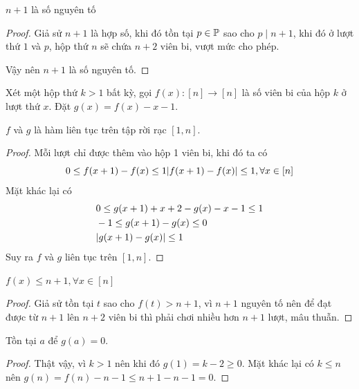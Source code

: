 \documentclass[11pt]{scrartcl}
\begin{document}
\begin{itemize}[label=, leftmargin=0em, itemsep=0.5em]
\begin{sol}
         $n + 1$ là số nguyên tố 
        \begin{proof}
            Giả sử $n + 1$ là hợp số, khi đó tồn tại $p \in \mathbb{P}$ sao cho $p \mid n + 1$, khi đó ở lượt thứ $1$ và $p$, hộp thứ $n$ sẽ chứa $n + 2$ viên bi, vượt mức cho phép.

            Vậy nên $n + 1$ là số nguyên tố.
        \end{proof}
        Xét một hộp thứ $k >1$ bất kỳ, gọi $f(x): [n] \to [n]$ là số viên bi của hộp $k$ ở lượt thứ $x$. Đặt $g(x) = f(x) - x - 1$. 
        
        
         $f$ và $g$ là hàm liên tục trên tập rời rạc $[1,n]$.
        \begin{proof}
          Mỗi lượt chỉ được thêm vào hộp 1 viên bi, khi đó ta có  
        \[
         0 \leq f(x + 1)  - f(x) \leq 1 \ra |f(x + 1) - f(x)| \leq 1, \forall x \in [n]
        \]
        Mặt khác lại có 
        \[
        \begin{aligned}
            &0 \leq g(x + 1) + x + 2 -g(x) -x - 1\leq 1\\
            & \ra -1 \leq g(x + 1) - g(x)\leq 0\\
            & \ra |g(x + 1) - g(x)| \leq 1
        \end{aligned}
        \]
        Suy ra $f$ và $g$ liên tục trên $[1,n]$.
        \end{proof}
         $f(x) \leq n + 1, \forall x \in [n]$
        \begin{proof}
            Giả sử tồn tại $t$ sao cho $f(t) > n + 1$, vì $n + 1$ nguyên tố nên để đạt được từ $n + 1$ lên $n + 2$ viên bi thì phải chơi nhiều hơn $n + 1$ lượt, mâu thuẫn.
        \end{proof}
         Tồn tại $a$ để $g(a) = 0$. 
        \begin{proof}
            Thật vậy, vì $k > 1$ nên khi đó $g(1) = k - 2 \geq 0$. Mặt khác lại có $k \leq n$ nên $g(n) = f(n) -n - 1\leq n + 1 - n -1= 0$. 
            

\end{proof}
\end{sol}
\end{itemize}
\end{document}
